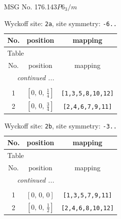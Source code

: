 \documentclass[fleqn,8pt]{jsarticle}
\begin{document}
\setcounter{MaxMatrixCols}{32}

\renewcommand{\tablename}{Table~}
\renewcommand{\figurename}{Figure~}
\begin{center}
\LARGE
MSG No. 176.143\quad$P6_{3}/m$
\end{center}
\renewcommand{\arraystretch}{1.2}
\begin{longtable}{ccc}
\caption{Wyckoff site: {\tt 2a}, site symmetry: {\tt -6..}}
 \\
 \hline \hline
No. & position & mapping \\ \hline \endfirsthead

\multicolumn{2}{l}{\tablename\ \thetable{}} \\
 \hline \hline
No. & position & mapping \\ \hline \endhead

 \hline \hline
\multicolumn{2}{r}{\footnotesize\it continued ...} \\ \endfoot

 \hline \hline
\multicolumn{2}{r}{} \\ \endlastfoot

1 & $\left[ 0,\, 0,\, \frac{1}{4} \right]$ & {\tt [1,3,5,8,10,12]} \\ \hline
2 & $\left[ 0,\, 0,\, \frac{3}{4} \right]$ & {\tt [2,4,6,7,9,11]} \\
\end{longtable}
\renewcommand{\arraystretch}{1.2}
\begin{longtable}{ccc}
\caption{Wyckoff site: {\tt 2b}, site symmetry: {\tt -3..}}
 \\
 \hline \hline
No. & position & mapping \\ \hline \endfirsthead

\multicolumn{2}{l}{\tablename\ \thetable{}} \\
 \hline \hline
No. & position & mapping \\ \hline \endhead

 \hline \hline
\multicolumn{2}{r}{\footnotesize\it continued ...} \\ \endfoot

 \hline \hline
\multicolumn{2}{r}{} \\ \endlastfoot

1 & $\left[ 0,\, 0,\, 0 \right]$ & {\tt [1,3,5,7,9,11]} \\ \hline
2 & $\left[ 0,\, 0,\, \frac{1}{2} \right]$ & {\tt [2,4,6,8,10,12]} \\
\end{longtable}
\renewcommand{\arraystretch}{1.2}
\end{document}

